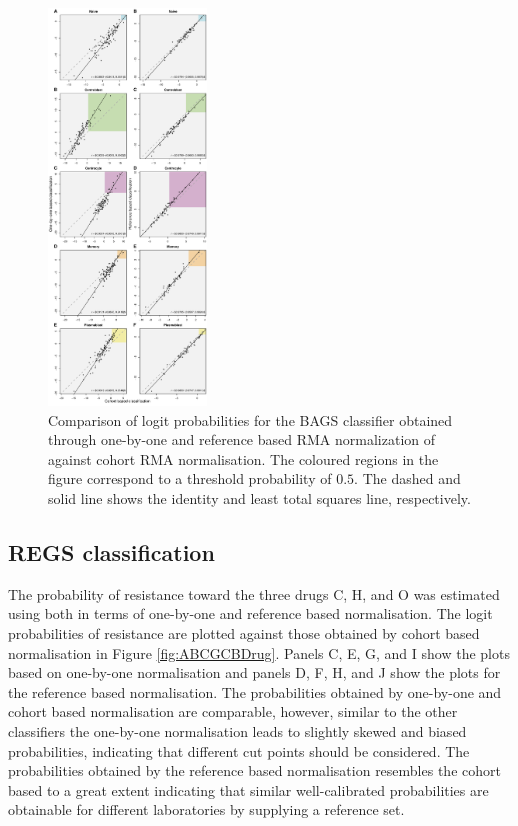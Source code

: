 \documentclass{article}
\begin{document}
\begin{figure}
\begin{center}
\includegraphics[width=0.375\textwidth]{figures/figure3.pdf}
\end{center}
\caption{Comparison of logit probabilities for the BAGS classifier obtained through one-by-one and reference based RMA normalization of \hemaClass{} against cohort RMA normalisation.
The coloured regions in the figure correspond to a threshold probability of $0.5$. The dashed and solid line shows the identity and least total squares line, respectively.}
\label{fig:Bagscorr}
\end{figure}
\newpage



\subsection{REGS classification}
The probability of resistance toward the three drugs C, H, and O was estimated using \hemaClass{} both in terms of one-by-one and reference based normalisation.
The logit probabilities of resistance are plotted against those obtained by cohort based normalisation in Figure \ref{fig:ABCGCBDrug}.
Panels C, E, G, and I show the plots based on one-by-one normalisation and panels D, F, H, and J show the plots for the reference based normalisation.
The probabilities obtained by one-by-one and cohort based normalisation are comparable, however, similar to the other classifiers the one-by-one normalisation leads to slightly skewed and biased probabilities, indicating that different cut points should be considered.
The probabilities obtained by the reference based normalisation resembles the cohort based to a great extent indicating that similar well-calibrated probabilities are obtainable for different laboratories by supplying a reference set.
\end{document}
